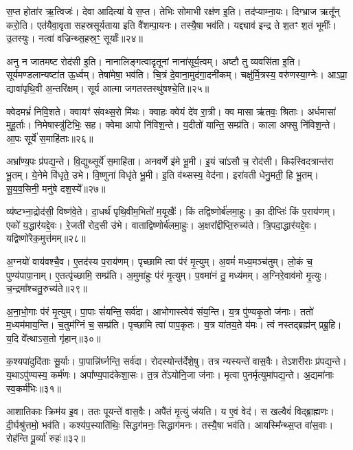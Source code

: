स॒प्त होता॑र ऋ॒त्विजः॑। देवा आदित्या॑ ये स॒प्त। 
तेभिः सोमाभी रक्ष॑ण इ॒ति। तद॑प्याम्ना॒यः। 
दिग्भ्राज ऋतू᳚न्‌ करो॒ति। एत॑यैवा॒वृता सहस्रसूर्यताया इति वै॑शम्पा॒यनः। 
तस्यै॒षा भव॑ति। यद्द्याव॑ इन्द्र ते श॒तꣳ श॒तं भूमीः᳚। 
उ॒तस्युः। नत्वा॑ वज्रिन्थ्स॒हस्र॒ꣳ॒ सूर्याः᳚॥२४॥\ip

अनु न जातमष्ट रोद॑सी इ॒ति। नानालिङ्गत्वादृतूनां नाना॑सूर्य॒त्वम्। 
अष्टौ तु व्यवसि॑ता इ॒ति। सूर्यमण्डलान्यष्टा॑त ऊ॒र्ध्वम्। 
तेषा॑मेषा॒ भव॑ति। चि॒त्रं दे॒वाना॒मुद॑गा॒दनी॑कम्। 
चक्षु॑र्मि॒त्रस्य॒ वरु॑णस्या॒ग्नेः। आ\-ऽप्रा॒ द्यावा॑पृथि॒वी अ॒न्तरि॑क्षम्। 
सूर्य आत्मा जगतस्तस्थु॑\-षश्चे॒ति॥२५॥\ip\anuvakamend


क्वेदमभ्रं॑ निवि॒शते। क्वायꣳ॑ संवथ्स॒रो मि॑थः। 
क्वाहः क्वेयं दे॑व रा॒त्री। क्व मासा ऋ॑तवः॒ श्रिताः। 
अर्धमासा॑ मुहू॒र्ताः। निमेषास्त्रु॑टिभिः॒ सह। 
क्वेमा आपो नि॑विश॒न्ते। य॒दीतो॑ यान्ति॒ सम्प्र॑ति। 
काला अफ्सु नि॑विश॒न्ते। आ॒पः सूर्ये॑ स॒माहि॑ताः॥२६॥\ip

अभ्रा᳚ण्य॒पः प्र॑पद्य॒न्ते। वि॒द्युथ्सूर्ये॑ स॒माहि॑ता। 
अनवर्णे इ॑मे भू॒मी। इ॒यं चा॑\-ऽसौ च॒ रोद॑सी। 
किꣴस्विदत्रान्त॑रा भू॒तम्। ये॒नेमे वि॑धृते॒ उभे। 
वि॒ष्णुना॑ विधृ॑ते भू॒मी। इ॒ति व॑थ्सस्य॒ वेद॑ना। 
इरा॑वती धेनु॒मती॒ हि भू॒तम्। सू॒य॒व॒सिनी॒ मनु॑षे दश॒स्ये᳚॥२७॥\ip

व्य॑ष्टभ्ना॒द्रोद॑सी॒ विष्ण॑वे॒ते। दा॒धर्थ॑ पृथि॒वीम॒भितो॑ म॒यूखैः᳚। 
किं तद्विष्णोर्ब॑ल\-मा॒हुः। का॒ दीप्तिः॑ किं प॒राय॑णम्। 
एको॑ य॒द्धार॑यद्दे॒वः। रे॒जती॑ रोद॒सी उ॑भे। 
वाताद्विष्णोर्ब॑लमा॒हुः। अ॒क्षरा᳚द्दीप्ति॒रुच्य॑ते। 
त्रि॒पदा॒द्धार॑यद्दे॒वः। यद्विष्णो॑रेक॒\-मुत्त॑मम्॥२८॥\ip

अ॒ग्नयो॑ वाय॑वश्चै॒व। ए॒तद॑स्य प॒राय॑णम्। 
पृच्छामि त्वा प॑रं मृ॒त्युम्। अ॒वमं॑ मध्य॒मञ्च॑तुम्। 
लो॒कं च॒ पुण्य॑पापा॒नाम्। ए॒तत्पृ॑च्छामि॒ सम्प्र॑ति। 
अ॒मुमा॑हुः प॑रं मृ॒त्युम्। प॒वमा॑नं तु॒ मध्य॑मम्। 
अ॒ग्निरे॒वाव॑मो मृ॒त्युः। च॒न्द्रमा᳚श्चतु॒रुच्य॑ते॥२९॥\ip

अ॒ना॒भो॒गाः प॑रं मृ॒त्युम्। पा॒पाः सं॑यन्ति॒ सर्व॑दा। 
आभोगास्त्वेव॑ संय॒न्ति। य॒त्र पु॑ण्यकृ॒तो ज॑नाः। 
ततो॑ म॒ध्यम॑माय॒न्ति। च॒तुम॑ग्निं च॒ सम्प्र॑ति। 
पृच्छामि त्वा॑ पाप॒कृतः। य॒त्र या॑तय॒ते य॑मः। 
त्वं नस्तद्ब्रह्म॑न्‌ प्रब्रू॒हि। य॒दि वे᳚त्था\-ऽस॒तो गृ॑हान्॥३०॥\ip

क॒श्यपा॑दुदि॑ताः सू॒र्याः। पा॒पान्नि॑र्घ्नन्ति॒ सर्व॑दा। 
रोदस्योन्त॑र्दे\-शे॒षु। तत्र न्यस्यन्ते॑ वास॒वैः। 
ते\-ऽशरीराः प्र॑पद्य॒न्ते। य॒था\-ऽपु॑ण्यस्य॒ कर्म॑णः। 
अपा᳚ण्य॒पाद॑केशा॒सः। त॒त्र ते॑\-ऽयोनि॒जा ज॑नाः। 
मृत्वा पुनर्मृत्युमा॑पद्य॒न्ते। अ॒द्यमा॑नाः स्व॒कर्म॑भिः॥३१॥\ip

आशातिकाः क्रिम॑य इ॒व। ततः पूयन्ते॑ वास॒वैः। अपै॑तं मृ॒त्युं ज॑यति। 
य ए॒वं वेद॑। स खल्वैवं॑ विद्ब्रा॒ह्मणः। दी॒र्घश्रु॑त्तमो॒ भव॑ति। 
कश्य॑प॒स्याति॑थिः॒ सिद्धग॑मनः॒ सिद्धाग॑मनः। तस्यै॒षा भव॑ति। 
आयस्मि᳚न्थ्स॒प्त वा॑स॒वाः। रोह॑न्ति पू॒र्व्या॑ रुहः॑॥३२॥\ip

